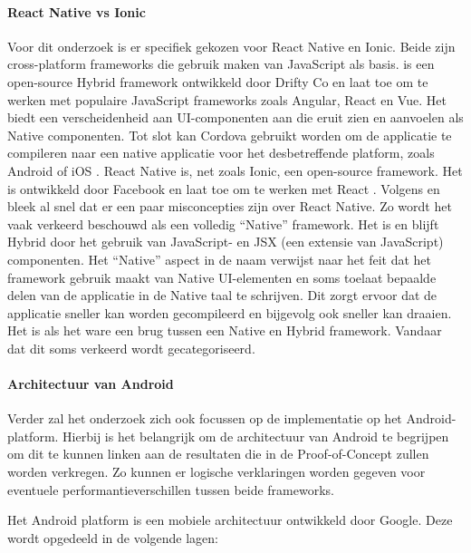 \paragraph{React Native vs Ionic}
\newline
Voor dit onderzoek is er specifiek gekozen voor React Native en Ionic. Beide zijn cross-platform frameworks die gebruik maken van JavaScript als basis. \textcite{Bron8} is een open-source Hybrid framework ontwikkeld door Drifty Co en laat toe om te werken met populaire JavaScript frameworks zoals Angular, React en Vue. Het biedt een verscheidenheid aan UI-componenten aan die eruit zien en aanvoelen als Native componenten. Tot slot kan Cordova gebruikt worden om de applicatie te compileren naar een native applicatie voor het desbetreffende platform, zoals Android of iOS \autocite{Bron8}.
React Native is, net zoals Ionic, een open-source framework. Het is ontwikkeld door Facebook en laat toe om te werken met React \autocite{Bron1}. Volgens \textcite{Bron3} en \textcite{Bron2} bleek al snel dat er een paar misconcepties zijn over React Native. Zo wordt het vaak verkeerd beschouwd als een volledig ``Native'' framework. Het is en blijft Hybrid door het gebruik van JavaScript- en JSX (een extensie van JavaScript) componenten. Het ``Native'' aspect in de naam verwijst naar het feit dat het framework gebruik maakt van Native UI-elementen en soms toelaat bepaalde delen van de applicatie in de Native taal te schrijven. Dit zorgt ervoor dat de applicatie sneller kan worden gecompileerd en bijgevolg ook sneller kan draaien. Het is als het ware een brug tussen een Native en Hybrid framework. Vandaar dat dit soms verkeerd wordt gecategoriseerd.

\paragraph{Architectuur van Android}
\newline

Verder zal het onderzoek zich ook focussen op de implementatie op het Android-platform. Hierbij is het belangrijk om de architectuur van Android te begrijpen om dit te kunnen linken aan de resultaten die in de Proof-of-Concept zullen worden verkregen. Zo kunnen er logische verklaringen worden gegeven voor eventuele performantieverschillen tussen beide frameworks.

Het Android platform is een mobiele architectuur ontwikkeld door Google. Deze wordt opgedeeld in de volgende lagen:

